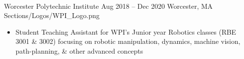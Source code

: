 \divider \\
    {Worcester Polytechnic Institute}
    {Aug 2018 -- Dec 2020}
    {Worcester, MA}
    {Sections/Logos/WPI_Logo.png}
    \begin{itemize}
        \item Student Teaching Assistant for WPI’s Junior year Robotics classes (RBE 3001 \& 3002) focusing on robotic manipulation, dynamics, machine vision, path-planning, \& other advanced concepts
    \end{itemize}

